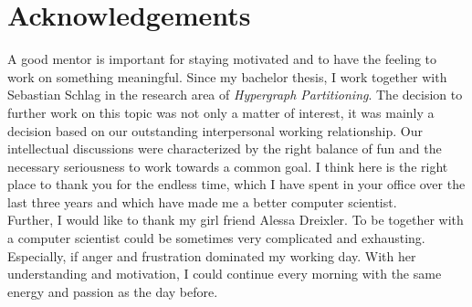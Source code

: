 \documentclass[12pt,a4paper,twoside, enabledeprecatedfontcommands]{scrartcl}
\numberwithin{equation}{section}
\begin{document}
\vfill


\vfill\vfill\vfill
\clearpage


\vspace*{0pt}\vfill

\section*{Acknowledgements}

A good mentor is important for staying motivated and to have the feeling to work
on something meaningful. Since my bachelor thesis, I work together with Sebastian
Schlag in the research area of \emph{Hypergraph Partitioning}. The decision to further
work on this topic was not only a matter of interest, it was mainly a decision based
on our outstanding interpersonal working relationship. Our intellectual discussions
were characterized by the right balance of fun and the necessary seriousness to work towards
a common goal. I think here is the right place to thank you for the endless time, which I have spent
in your office over the last three years and which have made me a better computer scientist. \\
Further, I would like to thank my girl friend Alessa Dreixler. To be together with a 
computer scientist could be sometimes very complicated and exhausting. Especially,
if anger and frustration dominated my working day. With her understanding and motivation, 
I could continue every morning with the same energy and passion as the day before.


\vfill\vfill\vfill
\clearpage


\pagestyle{normal}
\renewcommand\sectionmark[1]{\markboth{\thesection\quad\MakeUppercase{#1}}{\thesection\quad\MakeUppercase{#1}}}
\renewcommand\subsectionmark[1]{\markright{\thesubsection\quad\MakeUppercase{#1}}}

\setcounter{tocdepth}{2} 
\tableofcontents

\clearpage


%
\end{document}
